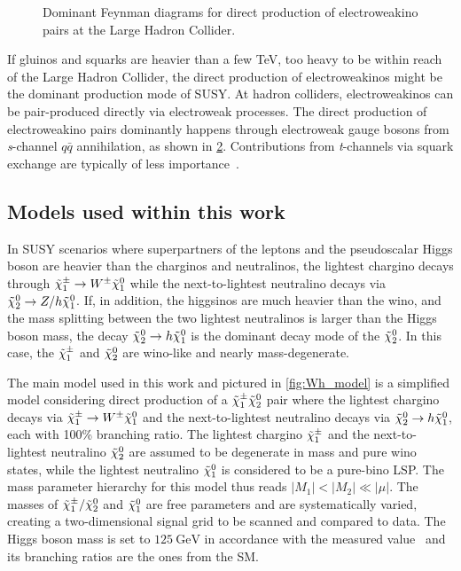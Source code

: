 \begin{figure}
\begin{subfigure}[b]{0.33\linewidth}
		\caption{\label{fig:electroweakino_production_3}}
	\end{subfigure}	
	\caption{Dominant Feynman diagrams for direct production of electroweakino pairs at the Large Hadron Collider.}\label{fig:electroweakino_production}
\end{figure}

If gluinos and squarks are heavier than a few TeV, \ie too heavy to be within reach of the Large Hadron Collider, the direct production of electroweakinos might be the dominant production mode of SUSY. At hadron colliders, electroweakinos can be pair-produced directly via electroweak processes. The direct production of electroweakino pairs dominantly happens through electroweak gauge bosons from \textit{s}-channel $q\bar{q}$ annihilation, as shown in \cref{fig:electroweakino_production}. Contributions from \textit{t}-channels via squark exchange are typically of less importance~\cite{Martin:1997ns}.


\subsection{Models used within this work}\label{sec:models_used}

In SUSY scenarios where superpartners of the leptons and the pseudoscalar Higgs boson are heavier than the charginos and neutralinos, the lightest chargino decays through $\tilde{\chi}_1^\pm\rightarrow W^\pm\tilde{\chi}_1^0$ while the next-to-lightest neutralino decays via $\tilde{\chi}_2^0\rightarrow Z/h\tilde{\chi}_1^0$. If, in addition, the higgsinos are much heavier than the wino, and the mass splitting between the two lightest neutralinos is larger than the Higgs boson mass, the decay $\tilde{\chi}_2^0\rightarrow h\tilde{\chi}_1^0$ is the dominant decay mode of the $\tilde{\chi}_2^0$. In this case, the $\tilde{\chi}_1^\pm$ and $\tilde{\chi}_2^0$ are wino-like and nearly mass-degenerate.

The main model used in this work and pictured in \cref{fig:Wh_model} is a simplified model considering direct production of a $\tilde{\chi}_1^\pm\tilde{\chi}_2^0$ pair where the lightest chargino decays via $\tilde{\chi}_1^\pm\rightarrow W^\pm\tilde{\chi}_1^0$ and the next-to-lightest neutralino decays via $\tilde{\chi}_2^0\rightarrow h\tilde{\chi}_1^0$, each with 100\% branching ratio. The lightest chargino $\tilde{\chi}_1^\pm$ and the next-to-lightest neutralino $\tilde{\chi}_2^0$ are assumed to be degenerate in mass and pure wino states, while the lightest neutralino $\tilde{\chi}_1^0$ is considered to be a pure-bino LSP. The mass parameter hierarchy for this model thus reads $\vert M_1 \vert < \vert M_2 \vert \ll \vert\mu\vert$. The masses of $\tilde{\chi}_1^\pm/\tilde{\chi}_2^0$ and $\tilde{\chi}_1^0$ are free parameters and are systematically varied, creating a two-dimensional signal grid to be scanned and compared to data. The Higgs boson mass is set to $\SI{125}{\GeV}$ in accordance with the measured value~\cite{Aad:2012tfa,Chatrchyan:2012ufa} and its branching ratios are the ones from the SM. 


